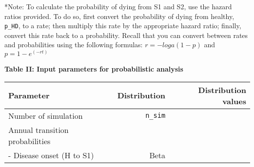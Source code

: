 \documentclass[
]{article}
\begin{document}
*Note: To calculate the probability of dying from S1 and S2, use the
hazard ratios provided. To do so, first convert the probability of dying
from healthy, \texttt{p\_HD}, to a rate; then multiply this rate by the
appropriate hazard ratio; finally, convert this rate back to a
probability. Recall that you can convert between rates and probabilities
using the following formulas: \(r = -loga(1-p)\) and \(p = 1-e^{(-rt)}\)

\textbf{Table II: Input parameters for probabilistic analysis}

\begin{longtable}[]{@{}lrr@{}}
\toprule
\begin{minipage}[b]{0.32\columnwidth}\raggedright
\textbf{Parameter}\strut
\end{minipage} & \begin{minipage}[b]{0.17\columnwidth}\raggedleft
\textbf{Distribution}\strut
\end{minipage} & \begin{minipage}[b]{0.42\columnwidth}\raggedleft
\textbf{Distribution values}\strut
\end{minipage}\tabularnewline
\midrule
\endhead
\begin{minipage}[t]{0.32\columnwidth}\raggedright
Number of simulation\strut
\end{minipage} & \begin{minipage}[t]{0.17\columnwidth}\raggedleft
\texttt{n\_sim}\strut
\end{minipage} & \begin{minipage}[t]{0.42\columnwidth}\raggedleft
1000\strut
\end{minipage}\tabularnewline
\begin{minipage}[t]{0.32\columnwidth}\raggedright
Annual transition probabilities\strut
\end{minipage} & \begin{minipage}[t]{0.17\columnwidth}\raggedleft
\strut
\end{minipage} & \begin{minipage}[t]{0.42\columnwidth}\raggedleft
\strut
\end{minipage}\tabularnewline
\begin{minipage}[t]{0.32\columnwidth}\raggedright
- Disease onset (H to S1)\strut
\end{minipage} & \begin{minipage}[t]{0.17\columnwidth}\raggedleft
Beta\strut
\end{minipage} & \begin{minipage}[t]{0.42\columnwidth}\raggedleft

\end{minipage}
\end{longtable}
\end{document}
